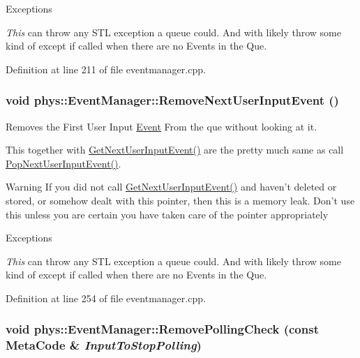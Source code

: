 \begin{DoxyExceptions}{Exceptions}
\item[{\em This}]can throw any STL exception a queue could. And with likely throw some kind of except if called when there are no Events in the Que. \end{DoxyExceptions}


Definition at line 211 of file eventmanager.cpp.

\hypertarget{classphys_1_1EventManager_add41b5f4d2942461bcaf40a97ad40b09}{
\subsubsection[{RemoveNextUserInputEvent}]{\setlength{\rightskip}{0pt plus 5cm}void phys::EventManager::RemoveNextUserInputEvent ()}}
\label{da/dde/classphys_1_1EventManager_add41b5f4d2942461bcaf40a97ad40b09}


Removes the First User Input \hyperlink{classphys_1_1Event}{Event} From the que without looking at it. 

This together with \hyperlink{classphys_1_1EventManager_ad61b660278f03702e0c564c7ad2dbc5d}{GetNextUserInputEvent()} are the pretty much same as call \hyperlink{classphys_1_1EventManager_a32d29a1a66e1f77b758f08e31a922a5a}{PopNextUserInputEvent()}. \begin{DoxyWarning}{Warning}
If you did not call \hyperlink{classphys_1_1EventManager_ad61b660278f03702e0c564c7ad2dbc5d}{GetNextUserInputEvent()} and haven't deleted or stored, or somehow dealt with this pointer, then this is a memory leak. Don't use this unless you are certain you have taken care of the pointer appropriately 
\end{DoxyWarning}

\begin{DoxyExceptions}{Exceptions}
\item[{\em This}]can throw any STL exception a queue could. And with likely throw some kind of except if called when there are no Events in the Que. \end{DoxyExceptions}


Definition at line 254 of file eventmanager.cpp.

\hypertarget{classphys_1_1EventManager_adaf7d5346932506ed43f893eb071fd39}{
\subsubsection[{RemovePollingCheck}]{\setlength{\rightskip}{0pt plus 5cm}void phys::EventManager::RemovePollingCheck (const {\bf MetaCode} \& {\em InputToStopPolling})}}
\label{da/dde/classphys_1_1EventManager_adaf7d5346932506ed43f893eb071fd39}


